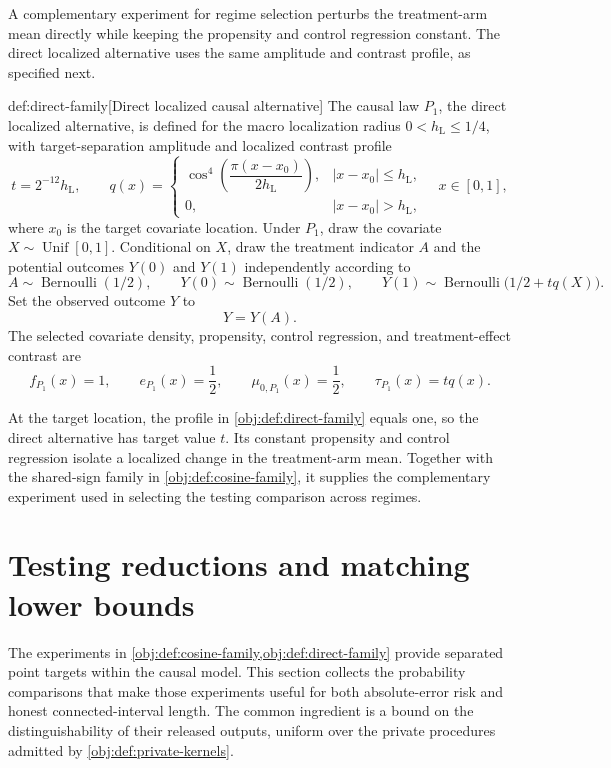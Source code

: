 \documentclass[11pt]{article}
\begin{document}
A complementary experiment for regime selection perturbs the treatment-arm mean directly while keeping the propensity and control regression constant. The direct localized alternative  uses the same amplitude and contrast profile, as specified next.

\begin{definitionv}{def:direct-family}[Direct localized causal alternative]
The causal law \(P_1\), the direct localized alternative, is defined for the macro localization radius \(0<h_{\mathrm L}\le 1/4\), with target-separation amplitude and localized contrast profile
\[
t=2^{-12}h_{\mathrm L},
\qquad
q(x)=
\begin{cases}
\cos^4\!\left(\dfrac{\pi(x-x_0)}{2h_{\mathrm L}}\right),
& |x-x_0|\le h_{\mathrm L},\\
0,& |x-x_0|>h_{\mathrm L},
\end{cases}
\quad x\in[0,1],
\]
where \(x_0\) is the target covariate location. Under \(P_1\), draw the covariate \(X\sim\operatorname{Unif}[0,1]\). Conditional on \(X\), draw the treatment indicator \(A\) and the potential outcomes \(Y(0)\) and \(Y(1)\) independently according to
\[
A\sim\operatorname{Bernoulli}(1/2),
\qquad
Y(0)\sim\operatorname{Bernoulli}(1/2),
\qquad
Y(1)\sim\operatorname{Bernoulli}\bigl(1/2+tq(X)\bigr).
\]
Set the observed outcome \(Y\) to
\[
Y=Y(A).
\]
The selected covariate density, propensity, control regression, and treatment-effect contrast are
\[
f_{P_1}(x)=1,\qquad
e_{P_1}(x)=\frac12,\qquad
\mu_{0,P_1}(x)=\frac12,\qquad
\tau_{P_1}(x)=tq(x).
\]
\end{definitionv}

At the target location, the profile in \cref{obj:def:direct-family} equals one, so the direct alternative has target value \(t\). Its constant propensity and control regression isolate a localized change in the treatment-arm mean. Together with the shared-sign family in \cref{obj:def:cosine-family}, it supplies the complementary experiment used in selecting the testing comparison across regimes.


\section{Testing reductions and matching lower bounds}

The experiments in \cref{obj:def:cosine-family,obj:def:direct-family} provide separated point targets within the causal model. This section collects the probability comparisons that make those experiments useful for both absolute-error risk and honest connected-interval length. The common ingredient is a bound on the distinguishability of their released outputs, uniform over the private procedures admitted by \cref{obj:def:private-kernels}.
\end{document}
